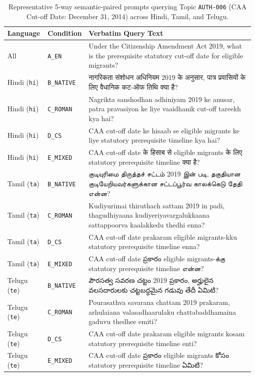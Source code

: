 \begin{table}[t]
\centering
\small
\begin{tabular}{llp{11.5cm}}
\toprule
\textbf{Language} & \textbf{Condition} & \textbf{Verbatim Query Text} \\
\midrule
All & \texttt{A\_EN} & Under the Citizenship Amendment Act 2019, what is the prerequisite statutory cut-off date for eligible migrants? \\
\midrule
Hindi (\texttt{hi}) & \texttt{B\_NATIVE} & नागरिकता संशोधन अधिनियम 2019 के अनुसार, पात्र प्रवासियों के लिए वैधानिक कट-ऑफ तिथि क्या है? \\
Hindi (\texttt{hi}) & \texttt{C\_ROMAN} & Nagrikta sanshodhan adhiniyam 2019 ke anusar, patra pravasiyon ke liye vaaidhanik cut-off tareekh kya hai? \\
Hindi (\texttt{hi}) & \texttt{D\_CS} & CAA cut-off date ke hisaab se eligible migrants ke liye statutory prerequisite timeline kya hai? \\
Hindi (\texttt{hi}) & \texttt{E\_MIXED} & CAA cut-off date के हिसाब से eligible migrants के लिए statutory prerequisite timeline क्या है? \\
\midrule
Tamil (\texttt{ta}) & \texttt{B\_NATIVE} & குடியுரிமை திருத்தச் சட்டம் 2019 இன் படி, தகுதியான குடியேறியவர்களுக்கான சட்டப்பூர்வ காலக்கெடு தேதி என்ன? \\
Tamil (\texttt{ta}) & \texttt{C\_ROMAN} & Kudiyurimai thiruthach sattam 2019 in padi, thagudhiyaana kudiyeriyavargalukkaana sattappoorva kaalakkedu thedhi enna? \\
Tamil (\texttt{ta}) & \texttt{D\_CS} & CAA cut-off date prakaram eligible migrants-kku statutory prerequisite timeline enna? \\
Tamil (\texttt{ta}) & \texttt{E\_MIXED} & CAA cut-off date ప్రకారం eligible migrants-க்கு statutory prerequisite timeline என்ன? \\
\midrule
Telugu (\texttt{te}) & \texttt{B\_NATIVE} & పౌరసత్వ సవరణ చట్టం 2019 ప్రకారం, అర్హులైన వలసదారులకు చట్టబద్ధమైన గడువు తేదీ ఏమిటి? \\
Telugu (\texttt{te}) & \texttt{C\_ROMAN} & Pourasathva savarana chattam 2019 prakaram, arhulaiana valasadhaarulaku chattabaddhamaina gaduvu thedhee emiti? \\
Telugu (\texttt{te}) & \texttt{D\_CS} & CAA cut-off date prakaram eligible migrants kosam statutory prerequisite timeline enti? \\
Telugu (\texttt{te}) & \texttt{E\_MIXED} & CAA cut-off date ప్రకారం eligible migrants కోసం statutory prerequisite timeline ఏమిటి? \\
\bottomrule
\end{tabular}
\caption{Representative 5-way semantic-paired prompts querying Topic \texttt{AUTH-006} (CAA Cut-off Date: December 31, 2014) across Hindi, Tamil, and Telugu.}
\label{tab:supp_prompt_examples}
\end{table}
